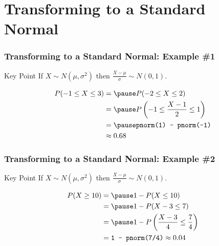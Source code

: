 \section{Transforming to a Standard Normal}
\begin{frame}[t]
  \frametitle{Transforming to a Standard Normal: Example \#1}

  \vspace{1em}

  \begin{alertblock}{Key Point}
    If $X \sim N(\mu, \sigma^2)$ then $\frac{X - \mu}{\sigma} \sim N(0,1)$.
  \end{alertblock}

  \begin{align*}
    P(-1 \leq X \leq 3) &= \pause P(-2 \leq X \leq 2) \\
    &= \pause P\left( -1 \leq \frac{X - 1}{2} \leq 1 \right)\\
    &= \pause \texttt{pnorm(1) - pnorm(-1)}\\
    &\approx 0.68
  \end{align*}

\end{frame}
\begin{frame}[t]
  \frametitle{Transforming to a Standard Normal: Example \#2}


  \vspace{1em}

  \begin{alertblock}{Key Point}
    If $X \sim N(\mu, \sigma^2)$ then $\frac{X - \mu}{\sigma} \sim N(0,1)$.
  \end{alertblock}

  \begin{align*}
    P(X \geq 10) &= \pause 1 - P(X \leq 10)\\
    &= \pause 1 - P(X - 3 \leq 7) \\
    &= \pause 1 - P\left( \frac{X - 3}{4} \leq \frac{7}{4} \right)\\
    &= \texttt{1 - pnorm(7/4)} \approx 0.04
  \end{align*}

\end{frame}
